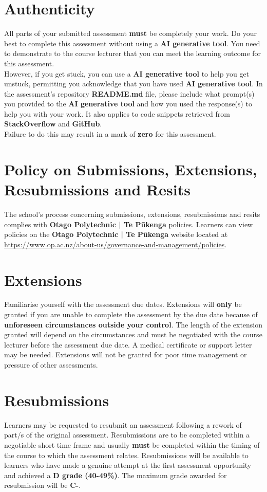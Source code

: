 \documentclass{article}
\begin{document}
\section*{Authenticity}
All parts of your submitted assessment \textbf{must} be completely your work. Do your best to complete this assessment without using a \textbf{AI generative tool}. You need to demonstrate to the course lecturer that you can meet the learning outcome for this assessment. \\
 
 However, if you get stuck, you can use a \textbf{AI generative tool} to help you get unstuck, permitting you acknowledge that you have used \textbf{AI generative tool}. In the assessment's repository \textbf{README.md} file, please include what prompt(s) you provided to the \textbf{AI generative tool} and how you used the response(s) to help you with your work. It also applies to code snippets retrieved from \textbf{StackOverflow} and \textbf{GitHub}. \\
 
 Failure to do this may result in a mark of \textbf{zero} for this assessment.

\section*{Policy on Submissions, Extensions, Resubmissions and Resits}
The school's process concerning submissions, extensions, resubmissions and resits complies with \textbf{Otago Polytechnic | Te Pūkenga} policies. Learners can view policies on the \textbf{Otago Polytechnic | Te Pūkenga} website located at \href{https://www.op.ac.nz/about-us/governance-and-management/policies}{https://www.op.ac.nz/about-us/governance-and-management/policies}. 

\section*{Extensions}
Familiarise yourself with the assessment due dates. Extensions will \textbf{only} be granted if you are unable to complete the assessment by the due date because of \textbf{unforeseen circumstances outside your control}. The length of the extension granted will depend on the circumstances and must be negotiated with the course lecturer before the assessment due date. A medical certificate or support letter may be needed. Extensions will not be granted for poor time management or pressure of other assessments.

\section*{Resubmissions}
Learners may be requested to resubmit an assessment following a rework of part/s of the original assessment. Resubmissions are to be completed within a negotiable short time frame and usually \textbf{must} be completed within the timing of the course to which the assessment relates. Resubmissions will be available to learners who have made a genuine attempt at the first assessment opportunity and achieved a \textbf{D grade (40-49\%)}. The maximum grade awarded for resubmission will be \textbf{C-}.
\end{document}
